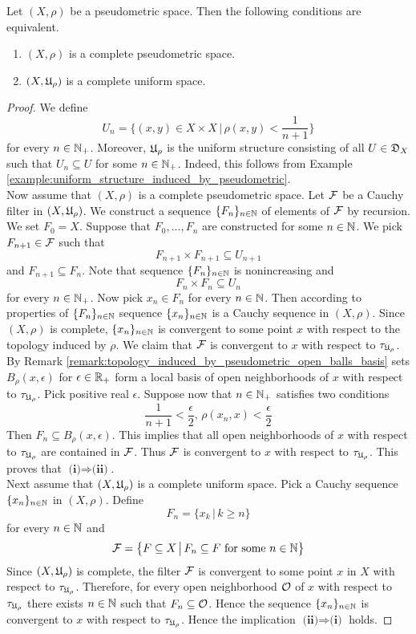 \begin{theorem}\label{theorem:complete_pseudometric_spaces}
Let $(X,\rho)$ be a pseudometric space. Then the following conditions are equivalent.
\begin{enumerate}[label=\emph{\textbf{(\roman*)}}, leftmargin=*]
\item $(X,\rho)$ is a complete pseudometric space. 
\item $(X,{\mathfrak U}_{\rho})$ is a complete uniform space.
\end{enumerate}
\end{theorem}
\begin{proof}
We define 
$$U_{n} = \bigg\{(x,y)\in X\times X\,\bigg|\,\rho(x,y) < \frac{1}{n + 1}\bigg\}$$
for every $n\in {\mathbb N}_+$. Moreover, ${\mathfrak U}_{\rho}$ is the uniform structure consisting of all $U \in {\mathfrak D}_X$ such that $U_n\subseteq U$ for some $n\in {\mathbb N}_+$. Indeed, this follows from Example \ref{example:uniform_structure_induced_by_pseudometric}.\\
Now assume that $(X,\rho)$ is a complete pseudometric space. Let ${\mathcal F}$ be a Cauchy filter in $\left(X,{\mathfrak U}_{\rho}\right)$. We construct a sequence $\{F_n\}_{n\in {\mathbb N}}$ of elements of ${\mathcal F}$ by recursion. We set $F_0 = X$. Suppose that $F_0,...,F_n$ are constructed for some $n\in {\mathbb N}$. We pick $F_{n+1}\in {\mathcal F}$ such that 
$$F_{n+1}\times F_{n+1} \subseteq U_{n+1}$$
and $F_{n+1} \subseteq F_n$. Note that sequence $\{F_n\}_{n\in {\mathbb N}}$ is nonincreasing and
$$F_{n}\times F_{n} \subseteq U_n$$
for every $n\in {\mathbb N}_+$. Now pick $x_n\in F_n$ for every $n\in {\mathbb N}$. Then according to properties of $\{F_n\}_{n\in {\mathbb N}}$ sequence $\{x_n\}_{n\in {\mathbb N}}$ is a Cauchy sequence in $(X,\rho)$. Since $(X,\rho)$ is complete, $\{x_n\}_{n\in {\mathbb N}}$ is convergent to some point $x$ with respect to the topology induced by $\rho$. We claim that ${\mathcal F}$ is convergent to $x$ with respect to $\tau_{{\mathfrak U}_{\rho}}$. By Remark \ref{remark:topology_induced_by_pseudometric_open_balls_basis} sets $B_{\rho}(x,\epsilon)$ for $\epsilon \in {\mathbb R}_+$ form a local basis of open neighborhoods of $x$ with respect to $\tau_{{\mathfrak U}_{\rho}}$. Pick positive real $\epsilon$. Suppose now that $n\in {\mathbb N}_+$ satisfies two conditions
$$\frac{1}{n+1} < \frac{\epsilon}{2},\,\rho(x_n,x) < \frac{\epsilon}{2}$$
Then $F_{n} \subseteq B_{\rho}(x,\epsilon)$. This implies that all open neighborhoods of $x$ with respect to $\tau_{{\mathfrak U}_{\rho}}$ are contained in ${\mathcal F}$. Thus ${\mathcal F}$ is convergent to $x$ with respect to $\tau_{{\mathfrak U}_{\rho}}$. This proves that $\textbf{(i)}\Rightarrow \textbf{(ii)}$.\\
Next assume that $(X,{\mathfrak U}_{\rho})$ is a complete uniform space. Pick a Cauchy sequence $\{x_n\}_{n\in {\mathbb N}}$ in $(X,\rho)$. Define
$$F_n = \big\{x_k\,\big|\,k\geq n\big\}$$
for every $n\in {\mathbb N}$ and
$${\mathcal F} = \big\{F\subseteq X\,\big|\,F_n\subseteq F\mbox{ for some }n\in {\mathbb N}\big\}$$
Since $(X,{\mathfrak U}_{\rho})$ is complete, the filter ${\mathcal F}$ is convergent to some point $x$ in $X$ with respect to $\tau_{{\mathfrak U}_{\rho}}$. Therefore, for every open neighborhood ${\mathcal O}$ of $x$ with respect to $\tau_{{\mathfrak U}_{\rho}}$ there exists $n\in {\mathbb N}$ such that $F_n \subseteq {\mathcal O}$. Hence the sequence $\{x_n\}_{n\in {\mathbb N}}$ is convergent to $x$ with respect to $\tau_{{\mathfrak U}_{\rho}}$. Hence the implication $\textbf{(ii)}\Rightarrow \textbf{(i)}$ holds.
\end{proof}
